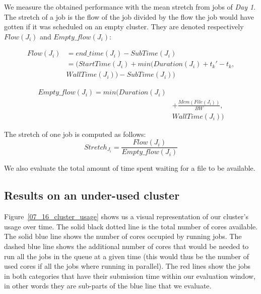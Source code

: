 \documentclass[conference,10pt]{IEEEtran}
\newcommand{\file}{\ensuremath{\mathit{File}}\xspace}
\newcommand{\memory}{\ensuremath{\mathit{Mem}}\xspace}
\newcommand{\duration}{\mathit{Duration}\xspace}
\newcommand{\bandwidth}{\mathit{BW}\xspace}
\newcommand{\submissiontime}{\mathit{SubTime}\xspace}
\newcommand{\walltime}{\mathit{WallTime}\xspace}
\newcommand{\start}{\mathit{StartTime}\xspace}
\begin{document}
We measure the obtained performance with the mean
stretch from jobs of \textit{Day 1}.
The stretch of a job is the flow of the job divided
by the flow the job would have gotten if it was scheduled on an empty cluster.
They are denoted respectively $Flow(J_i)$ and $Empty\_flow(J_i)$:

\begin{equation}
\begin{split}
Flow(J_i) & = end\_time(J_i) - \submissiontime(J_i) \\
& = (\start(J_i) + min(\duration(J_i) + t_k' - t_k, \\
& \walltime(J_i)) - \submissiontime(J_i))
\end{split}
\end{equation}

\begin{equation}
\begin{split}
Empty\_flow(J_i) = min(\duration(J_i) \\
& + \frac{\memory(\file(J_i))}{\bandwidth}, \\
&\walltime(J_i))
\end{split}
\end{equation}

The stretch of one job is computed as follows:
\begin{equation}
Stretch_{J_i} = \frac{Flow(J_i)}{Empty\_flow(J_i)}
\end{equation}

We also evaluate the total amount of time spent waiting for a file to be available.

\subsection{Results on an under-used cluster}

Figure~\ref{07_16_cluster_usage} shows us a visual representation of 
our cluster's usage over time. The solid black dotted line is the total
number of cores available.
The solid blue line shows the number of cores occupied by running jobs.
The dashed blue line shows the additional number of cores that would be needed
to run all the jobs in the queue at a given time (this would thus be the number
of used cores if all the jobs where running in parallel).
The red lines show the jobs in both categories that have their submission
time within our evaluation window, in other words they are sub-parts of the blue line
that we evaluate.
\end{document}
